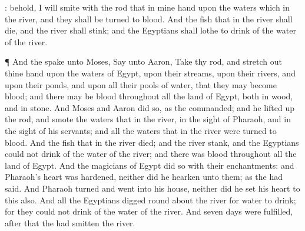 {{}: behold, I will
smite with the
rod that
{} in mine
hand upon the
waters which
{} in the
river, and they shall be
turned to
blood.
And the
fish that
{} in the
river shall
die, and the
river shall
stink; and the
Egyptians shall
lothe to
drink of the
water of the
river.
\par }{\PP {}¶ And the
{}
spake unto
Moses,
Say unto
Aaron,
Take thy
rod, and stretch
out thine
hand upon the
waters of
Egypt, upon their
streams, upon their
rivers, and upon their
ponds, and upon all their
pools of
water, that they may become
blood; and
{} there may be
blood throughout all the
land of
Egypt, both in
{}
wood, and in
{}
stone.
And
Moses and
Aaron
did so, as the
{}
commanded; and he lifted
up the
rod, and
smote the
waters that
{} in the
river, in the
sight of
Pharaoh, and in the
sight of his
servants; and all the
waters that
{} in the
river were
turned to
blood.
And the
fish that
{} in the
river
died; and the
river
stank, and the
Egyptians
could not
drink of the
water of the
river; and there was
blood throughout all the
land of
Egypt.
And the
magicians of
Egypt
did so with their
enchantments: and
Pharaoh’s
heart was
hardened, neither did he
hearken unto them; as the
{} had
said.
And
Pharaoh
turned and
went into his
house, neither did he
set his
heart to
this also.
And all the
Egyptians
digged round
about the
river for
water to
drink; for they
could not
drink of the
water of the
river.
And
seven
days were
fulfilled,
after that the
{} had
smitten the
river.

}
